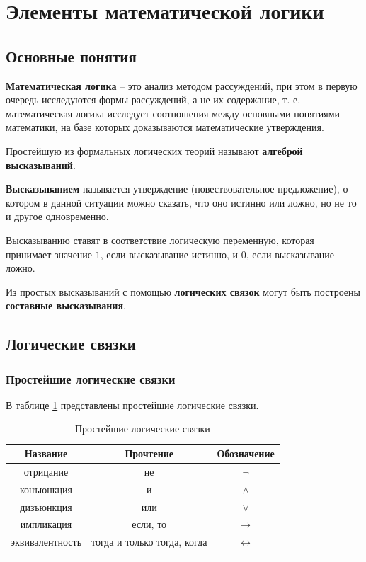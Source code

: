 \section{Элементы математической логики}

\subsection{Основные понятия}

\textbf{Математическая логика} -- это анализ методом рассуждений, при этом в первую очередь исследуются формы рассуждений, а не их содержание, т. е. математическая логика исследует соотношения между основными понятиями математики, на базе которых доказываются математические утверждения.

Простейшую из формальных логических теорий называют \textbf{алгеброй высказываний}.

\textbf{Высказыванием} называется утверждение (повествовательное предложение), о котором в данной ситуации можно сказать, что оно истинно или ложно, но не то и другое одновременно.

Высказыванию ставят в соответствие логическую переменную, которая принимает значение \(1\), если высказывание истинно, и \(0\), если высказывание ложно.

Из простых высказываний с помощью \textbf{логических связок} могут быть построены \textbf{составные высказывания}.

\subsection{Логические связки}

\subsubsection{Простейшие логические связки}

В таблице \ref{tab:simplest-logical-connectives} представлены простейшие логические связки.

{
\renewcommand*{\arraystretch}{1.5}
\begin{longtable}{|c|c|c|}
    \hline
    \textbf{Название} & \textbf{Прочтение}          & \textbf{Обозначение} \\
    \hline
    отрицание         & не                          & \(\lnot\)            \\
    \hline
    конъюнкция        & и                           & \(\land\)            \\
    \hline
    дизъюнкция        & или                         & \(\lor\)             \\
    \hline
    импликация        & если, то                    & \(\to\)              \\
    \hline
    эквивалентность   & тогда и только тогда, когда & \(\leftrightarrow\)  \\
    \hline
    \caption{Простейшие логические связки}
    \label{tab:simplest-logical-connectives}
\end{longtable}
}


